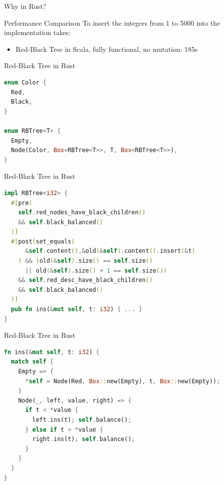 \begin{frame}[standout]
  Why in Rust?
\end{frame}

\begin{frame}{Performance Comparison}
To insert the integers from 1 to 5000 into the implementation takes:
\begin{itemize}
  \item Red-Black Tree in Scala, fully functional, no mutation: 185s
\end{itemize}
\end{frame}

\begin{frame}[fragile]{Red-Black Tree in Rust}
\begin{lstlisting}[language=Rust, caption={Data types with heap allocation}]
enum Color {
  Red,
  Black,
}

enum RBTree<T> {
  Empty,
  Node(Color, Box<RBTree<T>>, T, Box<RBTree<T>>),
}
\end{lstlisting}
\end{frame}


\begin{frame}[fragile]{Red-Black Tree in Rust}
\begin{lstlisting}[language=Rust, caption={Insert method with specification}]
impl RBTree<i32> {
  #[pre(
    self.red_nodes_have_black_children()
    && self.black_balanced()
  )]
  #[post(set_equals(
      &self.content(),&old(&self).content().insert(&t)
    ) && (old(&self).size() == self.size()
      || old(&self).size() + 1 == self.size())
    && self.red_desc_have_black_children()
    && self.black_balanced()
  )]
  pub fn ins(&mut self, t: i32) { ... }
}
\end{lstlisting}
\end{frame}

\begin{frame}[fragile]{Red-Black Tree in Rust}
\begin{lstlisting}[language=Rust, caption={Recursive insertion}]
fn ins(&mut self, t: i32) {
  match self {
    Empty => {
      *self = Node(Red, Box::new(Empty), t, Box::new(Empty));
    }
    Node(_, left, value, right) => {
      if t < *value {
        left.ins(t); self.balance();
      } else if t > *value {
        right.ins(t); self.balance();
      }
    }
  }
}
\end{lstlisting}
\end{frame}

